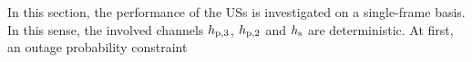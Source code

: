 In this section, the performance of the USs is investigated on a single-frame basis. In this sense, the involved channels $h_{\text{p,3}}$, $h_{\text{p,2}}$ and $h_{\text{s}}$ are deterministic.   
At first, an outage probability constraint

